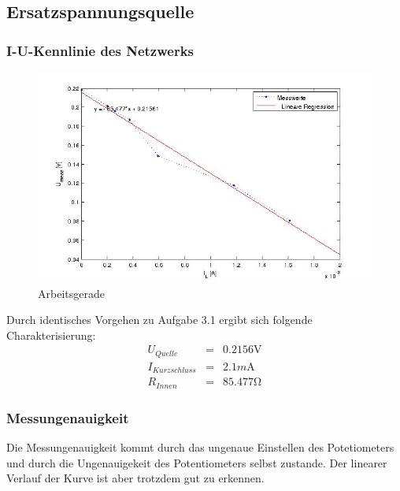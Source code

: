 \documentclass[10pt]{report}
\begin{document}
        \subsection{Ersatzspannungsquelle}
        \subsubsection{I-U-Kennlinie des Netzwerks}
        \begin{center}
            \begin{figure}[H]
              \includegraphics[width=\textwidth]{ErsatzspannungsQuelle.jpg}
              \caption{Arbeitsgerade}
            \end{figure}
        \end{center}

        Durch identisches Vorgehen zu Aufgabe 3.1 ergibt sich folgende
        Charakterisierung:
        \begin{eqnarray*}
            U_{Quelle} &=& 0.2156\si{\volt}\\
            I_{Kurzschluss} &=& 2.1\si{m\ampere}\\
            R_{Innen} &=& 85.477\si{\ohm}
        \end{eqnarray*}


        \subsubsection{Messungenauigkeit}
        Die Messungenauigkeit kommt durch das ungenaue Einstellen des Potetiometers
        und durch die Ungenauigekeit des Potentiometers selbst zustande. Der linearer Verlauf der Kurve ist aber trotzdem gut zu erkennen.
\end{document}

